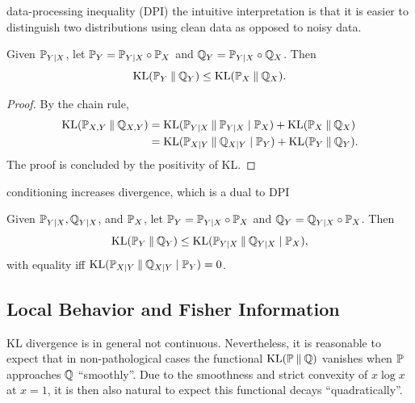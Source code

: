 data-processing inequality (DPI)
the intuitive interpretation is that it is easier to distinguish two distributions using clean data as opposed to noisy data.
\begin{proposition}
    Given $\mathbb{P}_{Y|X}$, let $\mathbb{P}_Y=\mathbb{P}_{Y|X}\circ\mathbb{P}_X$ and $\mathbb{Q}_Y=\mathbb{P}_{Y|X}\circ\mathbb{Q}_X$.
    Then 
    \[\operatorname{KL}(\mathbb{P}_Y\mathbin{\|}\mathbb{Q}_Y)\leq\operatorname{KL}(\mathbb{P}_X\mathbin{\|}\mathbb{Q}_X).\]
\end{proposition}
\begin{proof}
    By the chain rule,
    \begin{align*}
        \operatorname{KL}(\mathbb{P}_{X,Y}\mathbin{\|}\mathbb{Q}_{X,Y})&=\operatorname{KL}(\mathbb{P}_{Y|X}\mathbin{\|}\mathbb{P}_{Y|X}\mid\mathbb{P}_X)+\operatorname{KL}(\mathbb{P}_X\mathbin{\|}\mathbb{Q}_X)\\
        &=\operatorname{KL}(\mathbb{P}_{X|Y}\mathbin{\|}\mathbb{Q}_{X|Y}\mid\mathbb{P}_Y)+\operatorname{KL}(\mathbb{P}_Y\mathbin{\|}\mathbb{Q}_Y).
    \end{align*}
    The proof is concluded by the positivity of KL.
\end{proof}

conditioning increases divergence, which is a dual to DPI
\begin{proposition}
    Given $\mathbb{P}_{Y|X},\mathbb{Q}_{Y|X}$, and $\mathbb{P}_X$, let $\mathbb{P}_Y=\mathbb{P}_{Y|X}\circ\mathbb{P}_X$ and $\mathbb{Q}_Y=\mathbb{Q}_{Y|X}\circ\mathbb{P}_X$. Then 
    \[\operatorname{KL}(\mathbb{P}_Y\mathbin{\|}\mathbb{Q}_Y)\leq \operatorname{KL}(\mathbb{P}_{Y|X}\mathbin{\|}\mathbb{Q}_{Y|X}\mid\mathbb{P}_X),\]
    with equality iff $\operatorname{KL}(\mathbb{P}_{X|Y}\mathbin{\|}\mathbb{Q}_{X|Y}\mid\mathbb{P}_Y)=0$.
\end{proposition}

\subsection{Local Behavior and Fisher Information}
KL divergence is in general not continuous.
Nevertheless, it is reasonable to expect that in non-pathological cases the functional $\operatorname{KL}(\mathbb{P}\mathbin{\|}\mathbb{Q})$ vanishes when $\mathbb{P}$ approaches $\mathbb{Q}$ ``smoothly''.
Due to the smoothness and strict convexity of $x\log x$ at $x=1$, it is then also natural to expect this functional decays ``quadratically''.

